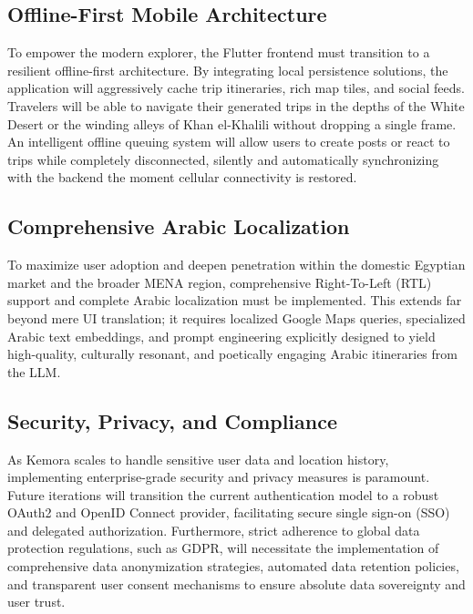 \subsection{Offline-First Mobile Architecture}
To empower the modern explorer, the Flutter frontend must transition to a resilient offline-first architecture. By integrating local persistence solutions, the application will aggressively cache trip itineraries, rich map tiles, and social feeds. Travelers will be able to navigate their generated trips in the depths of the White Desert or the winding alleys of Khan el-Khalili without dropping a single frame. An intelligent offline queuing system will allow users to create posts or react to trips while completely disconnected, silently and automatically synchronizing with the backend the moment cellular connectivity is restored.

\subsection{Comprehensive Arabic Localization}
To maximize user adoption and deepen penetration within the domestic Egyptian market and the broader MENA region, comprehensive Right-To-Left (RTL) support and complete Arabic localization must be implemented. This extends far beyond mere UI translation; it requires localized Google Maps queries, specialized Arabic text embeddings, and prompt engineering explicitly designed to yield high-quality, culturally resonant, and poetically engaging Arabic itineraries from the LLM.

\subsection{Security, Privacy, and Compliance}
As Kemora scales to handle sensitive user data and location history, implementing enterprise-grade security and privacy measures is paramount. Future iterations will transition the current authentication model to a robust OAuth2 and OpenID Connect provider, facilitating secure single sign-on (SSO) and delegated authorization. Furthermore, strict adherence to global data protection regulations, such as GDPR, will necessitate the implementation of comprehensive data anonymization strategies, automated data retention policies, and transparent user consent mechanisms to ensure absolute data sovereignty and user trust.


